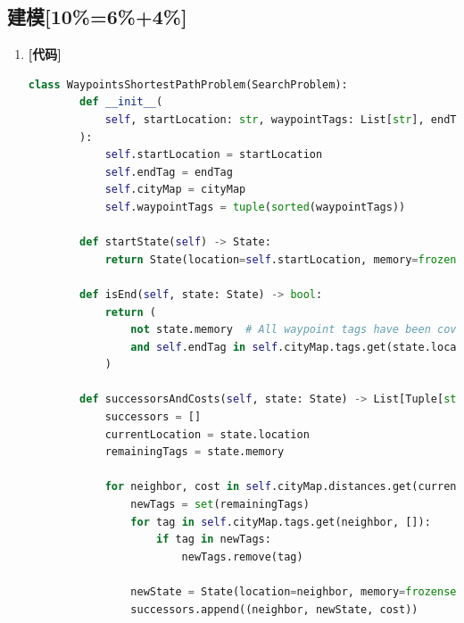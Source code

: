 \documentclass{article}
\begin{document}
\subsection{建模[10\%=6\%+4\%]}

\begin{enumerate}[label=(\alph*), start=1]

    \item \textbf{[代码]} %
    \begin{lstlisting}[language=Python]
    class WaypointsShortestPathProblem(SearchProblem):
    	def __init__(
    		self, startLocation: str, waypointTags: List[str], endTag: str, cityMap: CityMap
    	):
    		self.startLocation = startLocation
    		self.endTag = endTag
    		self.cityMap = cityMap
    		self.waypointTags = tuple(sorted(waypointTags))
    
    	def startState(self) -> State:
    		return State(location=self.startLocation, memory=frozenset(self.waypointTags))
    
    	def isEnd(self, state: State) -> bool:
    		return (
    			not state.memory  # All waypoint tags have been covered
    			and self.endTag in self.cityMap.tags.get(state.location, [])
    		)
    
    	def successorsAndCosts(self, state: State) -> List[Tuple[str, State, float]]:
    		successors = []
    		currentLocation = state.location
    		remainingTags = state.memory
    
    		for neighbor, cost in self.cityMap.distances.get(currentLocation, {}).items():
    			newTags = set(remainingTags)
    			for tag in self.cityMap.tags.get(neighbor, []):
    				if tag in newTags:
    					newTags.remove(tag)
    
    			newState = State(location=neighbor, memory=frozenset(newTags))
    			successors.append((neighbor, newState, cost))
    

\end{lstlisting}
\end{enumerate}
\end{document}

